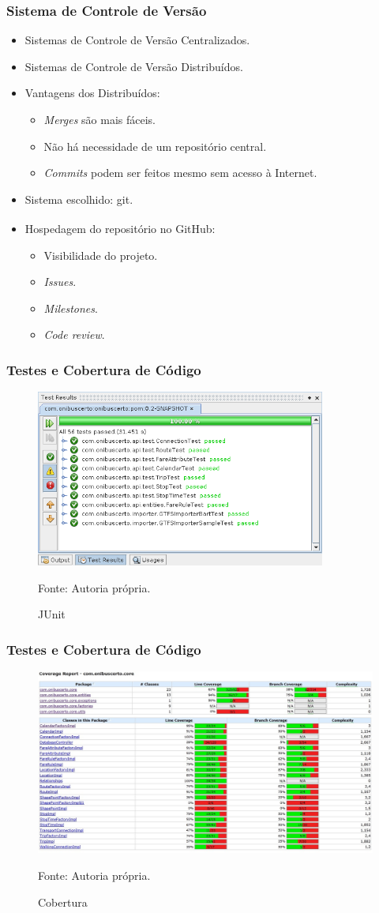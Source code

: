 \frame
{
\frametitle{Sistema de Controle de Versão}
	\begin{itemize}
		\item Sistemas de Controle de Versão Centralizados.
		\item Sistemas de Controle de Versão Distribuídos.
		\item Vantagens dos Distribuídos:
		\begin{itemize}
			\item \emph{Merges} são mais fáceis.
			\item Não há necessidade de um repositório central.
			\item \emph{Commits} podem ser feitos mesmo sem acesso à Internet.
		\end{itemize}
		\item Sistema escolhido: git.
		\item Hospedagem do repositório no GitHub{\textsuperscript\textregistered}:
		\begin{itemize}
			\item Visibilidade do projeto.
			\item \emph{Issues}.
			\item \emph{Milestones}.
			\item \emph{Code review}.
		\end{itemize}
	\end{itemize}
}

\frame
{
\frametitle{Testes e Cobertura de Código}
\begin{figure}
	\includegraphics[width=0.85\textwidth]{./imgs/testes.png}
	\caption{JUnit}
	\tiny
	Fonte: Autoria própria.
\end{figure}
}

\frame
{
\frametitle{Testes e Cobertura de Código}
\begin{figure}
	\includegraphics[width=\textwidth]{./imgs/cobertura.png}
	\caption{Cobertura}
	\tiny
	Fonte: Autoria própria.
\end{figure}
}

